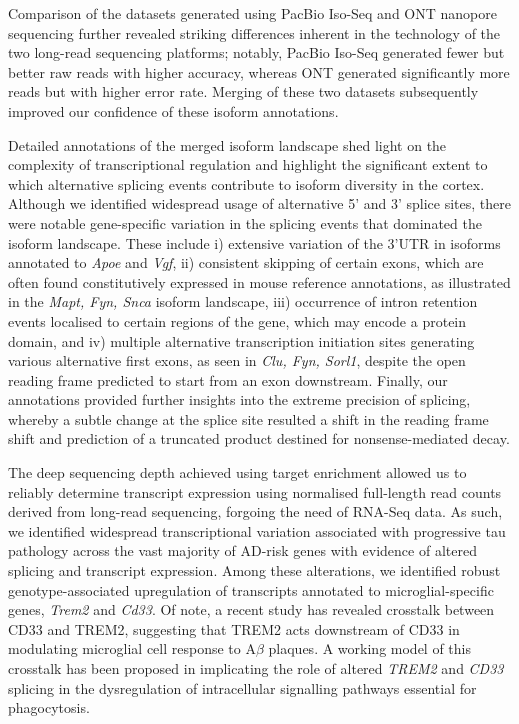 Comparison of the datasets generated using PacBio Iso-Seq and ONT nanopore sequencing further revealed striking differences inherent in the technology of the two long-read sequencing platforms; notably, PacBio Iso-Seq generated fewer but better raw reads with higher accuracy, whereas ONT generated significantly more reads but with higher error rate. Merging of these two datasets subsequently improved our confidence of these isoform annotations.

Detailed annotations of the merged isoform landscape shed light on the complexity of transcriptional regulation and highlight the significant extent to which alternative splicing events contribute to isoform diversity in the cortex. Although we identified widespread usage of alternative 5' and 3' splice sites, there were notable gene-specific variation in the splicing events that dominated the isoform landscape. These include i) extensive variation of the 3'UTR in isoforms annotated to \textit{Apoe} and \textit{Vgf}, ii) consistent skipping of certain exons, which are often found constitutively expressed in mouse reference annotations, as illustrated in the \textit{Mapt, Fyn, Snca} isoform landscape, iii) occurrence of intron retention events localised to certain regions of the gene, which may encode a protein domain, and iv) multiple alternative transcription initiation sites generating various alternative first exons, as seen in \textit{Clu, Fyn, Sorl1}, despite the open reading frame predicted to start from an exon downstream. Finally, our annotations provided further insights into the extreme precision of splicing, whereby a subtle change at the splice site resulted a shift in the reading frame shift and prediction of a truncated product destined for nonsense-mediated decay. 

The deep sequencing depth achieved using target enrichment allowed us to reliably determine transcript expression using normalised full-length read counts derived from long-read sequencing, forgoing the need of RNA-Seq data. As such, we identified widespread transcriptional variation associated with progressive tau pathology across the vast majority of AD-risk genes with evidence of altered splicing and transcript expression. Among these alterations, we identified robust genotype-associated upregulation of transcripts annotated to microglial-specific genes, \textit{Trem2} and \textit{Cd33}. Of note, a recent study has revealed crosstalk between CD33 and TREM2, suggesting that TREM2 acts downstream of CD33 in modulating microglial cell response to A$\beta$ plaques\cite{Griciuc2019}. A working model of this crosstalk has been proposed in implicating the role of altered \textit{TREM2} and \textit{CD33} splicing in the dysregulation of intracellular signalling pathways essential for phagocytosis\cite{Griciuc2021}.

